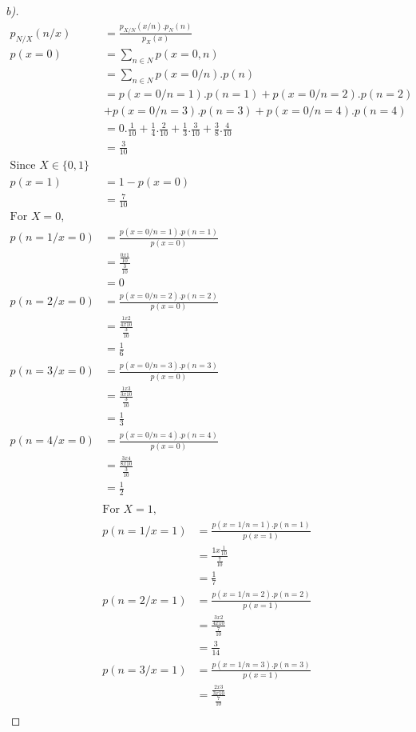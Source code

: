 \documentclass[12pt]{article}
\newenvironment{theorem}[2][Theorem]{\begin{trivlist}
\item[\hskip \labelsep {\bfseries #1}\hskip \labelsep {\bfseries #2.}]}{\end{trivlist}}
\begin{document}
\begin{theorem}[Ans]{5}
\begin{proof}[b)]
\begin{align*}
p_{N/X}(n/x) &= \frac{p_{X/N}(x/n).p_{N}(n)}{p_{X}(x)}\\
p(x=0) &= \sum_{n\in N}p(x=0,n)\\
&= \sum_{n\in N}p(x=0/n).p(n)\\
&= p(x=0/n=1).p(n=1)+p(x=0/n=2).p(n=2)\\&+p(x=0/n=3).p(n=3)+p(x=0/n=4).p(n=4)\\
&=0.\frac{1}{10}+\frac{1}{4}.\frac{2}{10}+\frac{1}{3}.\frac{3}{10}+\frac{3}{8}.\frac{4}{10}\\
&=\frac{3}{10}\\
\text{Since }X\in \{0,1\}\\
p(x=1)&=1-p(x=0)\\
&= \frac{7}{10}\\
\text{For }X=0,\\
p(n=1/x=0)&=\frac{p(x=0/n=1).p(n=1)}{p(x=0)}\\
&=\frac{\frac{0x1}{10}}{\frac{3}{10}}\\
&=0\\
p(n=2/x=0)&=\frac{p(x=0/n=2).p(n=2)}{p(x=0)}\\
&=\frac{\frac{1x2}{4x10}}{\frac{3}{10}}\\
&=\frac{1}{6}\\
p(n=3/x=0)&=\frac{p(x=0/n=3).p(n=3)}{p(x=0)}\\
&=\frac{\frac{1x3}{3x10}}{\frac{3}{10}}\\
&=\frac{1}{3}\\
p(n=4/x=0)&=\frac{p(x=0/n=4).p(n=4)}{p(x=0)}\\
&=\frac{\frac{3x4}{8x10}}{\frac{3}{10}}\\
&=\frac{1}{2}\\
\end{align*}
\begin{align*}
\text{For }X=1,\\
p(n=1/x=1)&=\frac{p(x=1/n=1).p(n=1)}{p(x=1)}\\
&=\frac{1x\frac{1}{10}}{\frac{7}{10}}\\
&=\frac{1}{7}\\
p(n=2/x=1)&=\frac{p(x=1/n=2).p(n=2)}{p(x=1)}\\
&=\frac{\frac{3x2}{4x10}}{\frac{7}{10}}\\
&=\frac{3}{14}\\
p(n=3/x=1)&=\frac{p(x=1/n=3).p(n=3)}{p(x=1)}\\
&=\frac{\frac{2x3}{3x10}}{\frac{7}{10}}\\

\end{align*}
\end{proof}
\end{theorem}
\end{document}
